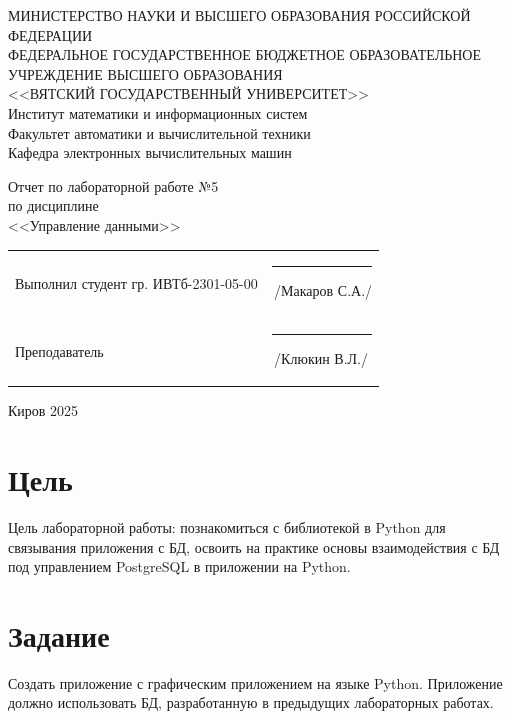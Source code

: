 \documentclass[a4paper,14pt]{extarticle}
\begin{document}
  \newpage\thispagestyle{empty}
  \begin{center}
    \MakeUppercase{
      Министерство науки и высшего образования Российской Федерации\\
      Федеральное государственное бюджетное образовательное учреждение высшего образования\\
      <<Вятский Государственный Университет>>\\
    }
    Институт математики и информационных систем\\
    Факультет автоматики и вычислительной техники\\
    Кафедра электронных вычислительных машин
  \end{center}
  \vfill

  \begin{center}
    Отчет по лабораторной работе №5\\
    по дисциплине\\
    <<Управление данными>>\\
  \end{center}
  \vfill

  \noindent
  \begin{tabular}{ll}
    Выполнил студент гр. ИВТб-2301-05-00 \hspace{5mm} &
    \rule[-1mm]{25mm}{0.10mm}\,/Макаров С.А./\\
    
    Преподаватель & \rule[-1mm]{25mm}{0.10mm}\,/Клюкин В.Л./\\
  \end{tabular}

  \vfill
  \begin{center}
    Киров 2025
  \end{center}

  \newpage
  \section*{Цель}
  Цель лабораторной работы: познакомиться с библиотекой в Python для связывания приложения с БД, освоить на практике основы взаимодействия с БД под управлением PostgreSQL в приложении на Python.

  \section*{Задание}
  Создать приложение с графическим приложением на языке Python. Приложение должно использовать БД, разработанную в предыдущих лабораторных работах.
\end{document}
